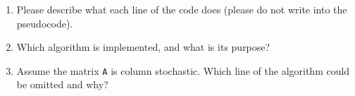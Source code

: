 \begin{center}
	\vspace*{-0.5cm}
	\begin{minipage}{0.8\textwidth}
		
	\end{minipage}
\end{center}
%	
\begin{enumerate}
	\item Please describe what each line of the code does (please do not write into the pseudocode).
	\item Which algorithm is implemented, and what is its purpose?
	\item Assume the matrix \verb|A| is column stochastic. Which line of the algorithm could be omitted and why?
\end{enumerate}

